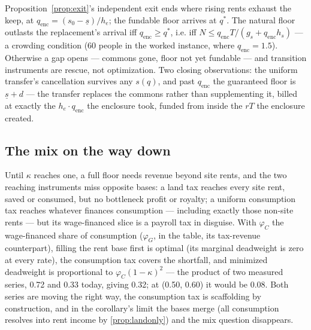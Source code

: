 \documentclass[12pt]{article}
\theoremstyle{plain}
\begin{document}
Proposition~\ref{prop:exit}'s independent exit ends where rising rents exhaust the keep, at $q_{\mathrm{enc}} = (s_0-\underline{s})/h_e$; the fundable floor arrives at $q^*$. The natural floor outlasts the replacement's arrival iff $q_{\mathrm{enc}} \ge q^*$, i.e. iff $N \le q_{\mathrm{enc}}T/(g_s + q_{\mathrm{enc}}h_s)$ --- a crowding condition (60 people in the worked instance, where $q_{\mathrm{enc}} = 1.5$). Otherwise a gap opens --- commons gone, floor not yet fundable --- and transition instruments are rescue, not optimization. Two closing observations: the uniform transfer's cancellation survives any $s(q)$, and past $q_{\mathrm{enc}}$ the guaranteed floor is $\underline{s} + d$ --- the transfer replaces the commons rather than supplementing it, billed at exactly the $h_e\cdot q_{\mathrm{enc}}$ the enclosure took, funded from inside the $rT$ the enclosure created.

\subsection{The mix on the way down}\label{app:mix}

Until $\kappa$ reaches one, a full floor needs revenue beyond site rents, and the two reaching instruments miss opposite bases: a land tax reaches every site rent, saved or consumed, but no bottleneck profit or royalty; a uniform consumption tax reaches whatever finances consumption --- including exactly those non-site rents --- but its wage-financed slice is a payroll tax in disguise. With $\varphi _C$ the wage-financed share of consumption ($\varphi _G$, in the table, its tax-revenue counterpart), filling the rent base first is optimal (its marginal deadweight is zero at every rate), the consumption tax covers the shortfall, and minimized deadweight is proportional to $\varphi _C(1-\kappa )^2$ --- the product of two measured series, 0.72 and 0.33 today, giving 0.32; at (0.50, 0.60) it would be 0.08. Both series are moving the right way, the consumption tax is scaffolding by construction, and in the corollary's limit the bases merge (all consumption resolves into rent income by \ref{prop:landonly}) and the mix question disappears.
\end{document}
